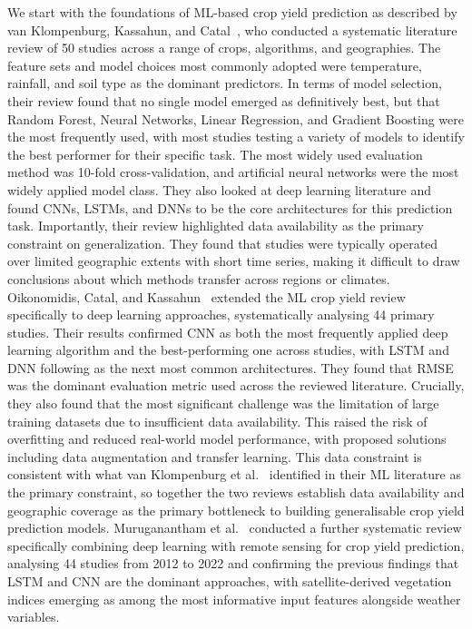 \documentclass[pdflatex,sn-mathphys-num, oneside, 11pt]{sn-jnl}%
\theoremstyle{thmstyleone}%
\theoremstyle{thmstyletwo}%
\theoremstyle{thmstylethree}%
\begin{document}
We start with the foundations of ML-based crop yield prediction as described by van Klompenburg, Kassahun, and Catal~\cite{bib14}, who conducted a systematic literature review of 50 studies across a range of crops, algorithms, and geographies. The feature sets and model choices most commonly adopted were temperature, rainfall, and soil type as the dominant predictors. In terms of model selection, their review found that no single model emerged as definitively best, but that Random Forest, Neural Networks, Linear Regression, and Gradient Boosting were the most frequently used, with most studies testing a variety of models to identify the best performer for their specific task. The most widely used evaluation method was 10-fold cross-validation, and artificial neural networks were the most widely applied model class. They also looked at deep learning literature and found CNNs, LSTMs, and DNNs to be the core architectures for this prediction task. Importantly, their review highlighted data availability as the primary constraint on generalization. They found that studies were typically operated over limited geographic extents with short time series, making it difficult to draw conclusions about which methods transfer across regions or climates. Oikonomidis, Catal, and Kassahun~\cite{bib15} extended the ML crop yield review specifically to deep learning approaches, systematically analysing 44 primary studies. Their results confirmed CNN as both the most frequently applied deep learning algorithm and the best-performing one across studies, with LSTM and DNN following as the next most common architectures. They found that RMSE was the dominant evaluation metric used across the reviewed literature. Crucially, they also found that the most significant challenge was the limitation of large training datasets due to insufficient data availability. This raised the risk of overfitting and reduced real-world model performance, with proposed solutions including data augmentation and transfer learning. This data constraint is consistent with what van Klompenburg et al.~\cite{bib14} identified in their ML literature as the primary constraint, so together the two reviews establish data availability and geographic coverage as the primary bottleneck to building generalisable crop yield prediction models. Muruganantham et al.~\cite{bib20} conducted a further systematic review specifically combining deep learning with remote sensing for crop yield prediction, analysing 44 studies from 2012 to 2022 and confirming the previous findings that LSTM and CNN are the dominant approaches, with satellite-derived vegetation indices emerging as among the most informative input features alongside weather variables.\\
 
\end{document}
